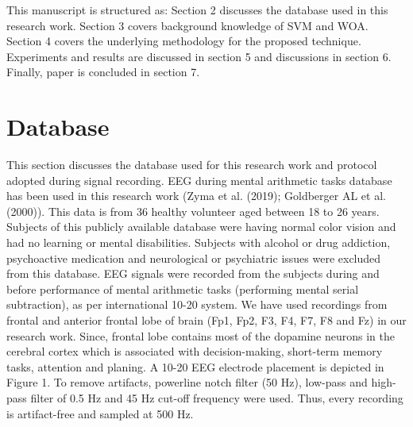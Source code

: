 \documentclass{article}
\begin{document}
This manuscript is structured as: Section 2 discusses the database used in this research work. Section 3 covers background knowledge of SVM and WOA. Section 4 covers the underlying methodology for the proposed technique. Experiments and results are discussed in section 5 and discussions in section 6. Finally, paper is concluded in section 7.


\section{Database}


This section discusses the database used for this research work and protocol adopted during signal recording. EEG during mental arithmetic tasks database has been used in this research work (Zyma et al. (2019); Goldberger AL et al. (2000)). This data is from 36 healthy volunteer aged between 18 to 26 years. Subjects of this publicly available database were having normal color vision and had no learning or mental disabilities. Subjects with alcohol or drug addiction, psychoactive medication and neurological or psychiatric issues were excluded from this database. EEG signals were recorded from the subjects during and before performance of mental arithmetic tasks (performing mental serial subtraction), as per international 10-20 system. We have used recordings from frontal and anterior frontal lobe of brain (Fp1, Fp2, F3, F4, F7, F8 and Fz) in our research work. Since, frontal lobe contains most of the dopamine neurons in the cerebral cortex which is associated with decision-making, short-term memory tasks, attention and planing. A 10-20 EEG electrode placement is depicted in Figure 1. To remove artifacts, powerline notch filter (50 Hz), low-pass and high-pass filter of 0.5 $\mathrm{Hz}$ and 45 Hz cut-off frequency were used. Thus, every recording is artifact-free and sampled at 500 Hz.
\end{document}
